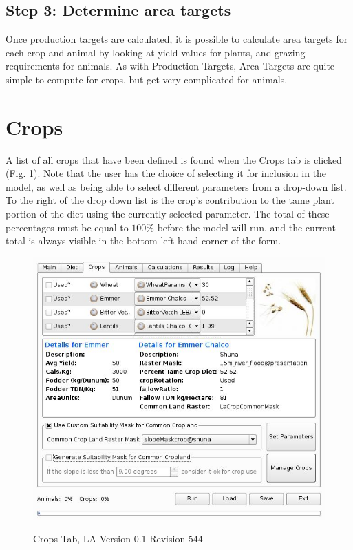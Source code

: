 \subsection{Step 3: Determine area targets}
Once production targets are calculated, it is possible to calculate area
targets for each crop and animal by looking at yield values for plants, and
grazing requirements for animals.  As with Production Targets, Area Targets are
quite simple to compute for crops, but get very complicated for animals.

\section{Crops}
    A list of all crops that have been defined is found when the Crops tab is
    clicked (Fig. \ref{fig:crop}).  Note that the user has the choice of
    selecting it for inclusion in the model, as well as being able to select
    different parameters from a drop-down list.  To the right of the drop down
    list is the crop's contribution to the tame plant portion of the diet using
    the currently selected parameter.  The total of these percentages must be
    equal to $100\%$ before the model will run, and the current total is always
    visible in the bottom left hand corner of the form.

    \begin{figure}[htbp]
        \includegraphics[scale=.366]{./images/LanduseAnalystCrops546.jpg}
      \label{fig:crop} \caption{Crops Tab, LA Version 0.1 Revision 544}
    \end{figure}

